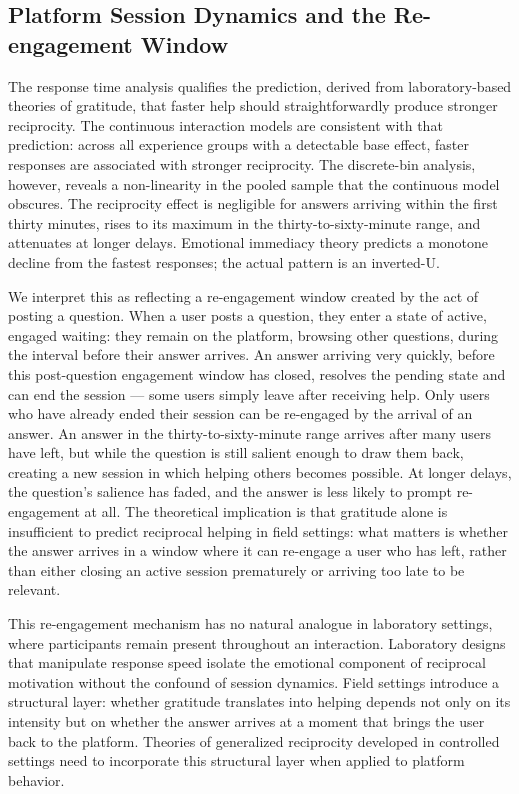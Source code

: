 \subsection{Platform Session Dynamics and the Re-engagement Window}

The response time analysis qualifies the prediction, derived from laboratory-based theories of gratitude, that faster help should straightforwardly produce stronger reciprocity. The continuous interaction models are consistent with that prediction: across all experience groups with a detectable base effect, faster responses are associated with stronger reciprocity. The discrete-bin analysis, however, reveals a non-linearity in the pooled sample that the continuous model obscures. The reciprocity effect is negligible for answers arriving within the first thirty minutes, rises to its maximum in the thirty-to-sixty-minute range, and attenuates at longer delays. Emotional immediacy theory predicts a monotone decline from the fastest responses; the actual pattern is 
an inverted-U.

We interpret this as reflecting a re-engagement window created by the act of posting a question. When a user posts a question, they enter a state of active, engaged waiting: they remain on the platform, browsing other questions, during the interval before their answer arrives. An answer arriving very quickly, before this post-question engagement window has closed, resolves the pending state and can end the session --- some users simply leave after receiving help. Only users who have already ended their session can be re-engaged by the arrival of an answer. An answer in the thirty-to-sixty-minute range arrives after many users have left, but while the question is still salient enough to draw them back, creating a new session in which helping others becomes possible. At longer delays, the question's salience has faded, and the answer is less likely to prompt re-engagement at all. The theoretical implication is that gratitude alone is insufficient to predict reciprocal helping in field settings: what matters is whether the answer arrives in a window where it can re-engage a user who has left, rather than either closing an active session prematurely or arriving too late to be relevant.

This re-engagement mechanism has no natural analogue in laboratory settings, where participants remain present throughout an interaction. Laboratory designs that manipulate response speed isolate the emotional component of reciprocal motivation without the confound of session dynamics. Field settings introduce a structural layer: whether gratitude translates into helping depends not only on its intensity but on whether the answer arrives at a moment that brings the user back to the platform. Theories of generalized reciprocity developed in controlled settings need to incorporate this structural layer when applied to platform behavior.

